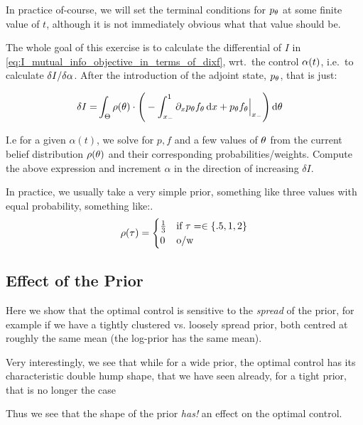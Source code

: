 \documentclass{article}
\begin{document}
In practice of-course, we will set the terminal conditions for $p_{\theta}$ at some
finite value of $t$, although it is not immediately obvious what that
value should be.

\vskip10pt The whole goal of this exercise is to calculate the differential of
$I$ in \cref{eq:I_mutual_info_objective_in_terms_of_dixf},
wrt.\ the control ${\alpha}(t)$, i.e.\ to calculate $\delta I / \delta {\alpha}$. After the
introduction of the adjoint state, $p_{\theta}$, that is just:

 
\begin{align*}
\delta I =&   
\int_\Theta  \rho({\theta}) \cdot \Bigg(  
- \int_{ x_{-} }^{1} {\partial}_x p_{\theta} f_{\theta} \, \mathrm{d} x + 
   p_{\theta} f_{\theta} \Big|_{ x_{-} } 
    \Bigg) \, \mathrm{d} {\theta}
\end{align*}

I.e for a given $\alpha(t)$, we solve for $p,f$ and a few values of ${\theta}$ from
the current belief distribution $\rho({\theta})$ and their corresponding
probabilities/weights. Compute the above expression and increment $\alpha$ in
the direction of increasing $\delta I$.

In practice, we usually take a very simple prior, something like three values
with equal probability, something like:.
\begin{equation}
\rho({ \tau }) = 
\begin{cases}
	\tfrac 13 & \textrm{if } { \tau }= \in \{.5,    1 ,  2 \}\\
	0   &\textrm{o/w }
\end{cases}
\label{eq:basic_prior_over_tau}
\end{equation} 

\subsection{Effect of the Prior}

Here we show that the optimal control is sensitive to the {\sl spread} of the
prior, for example if we have a tightly clustered vs. loosely spread prior, both
centred at roughly the same mean (the log-prior has the same mean). 

Very interestingly, we see that while for a wide prior, the optimal control has
its characteristic double hump shape, that we have seen already, for a tight
prior, that is no longer the case

Thus we see that the shape of the prior {\sl has!}
an effect on the optimal control.
\end{document}
